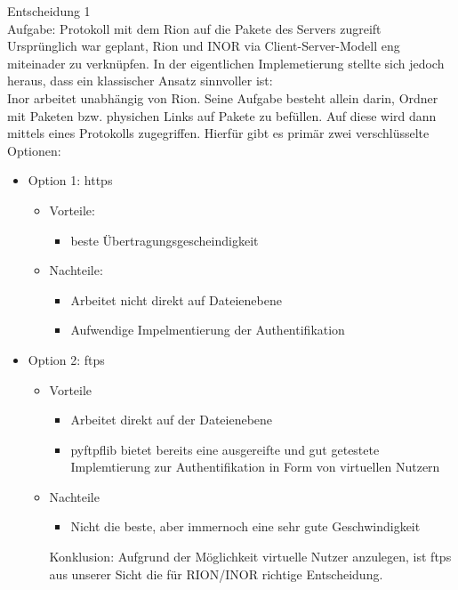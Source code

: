 Entscheidung 1\\
Aufgabe: Protokoll mit dem Rion auf die Pakete des Servers zugreift\\

Ursprünglich war geplant, Rion und INOR via Client-Server-Modell eng miteinader zu
verknüpfen. In der eigentlichen Implemetierung stellte sich jedoch heraus, dass ein
klassischer Ansatz sinnvoller ist: \\

Inor arbeitet unabhängig von Rion. Seine Aufgabe besteht allein darin, Ordner mit Paketen
bzw. physichen Links auf Pakete zu befüllen. Auf diese wird dann mittels eines Protokolls
zugegriffen. Hierfür gibt es primär zwei verschlüsselte Optionen:\\

\begin{itemize}
    \item Option 1: https
    \begin{itemize}
        \item Vorteile:
            \begin{itemize}
                \item beste Übertragungsgescheindigkeit
            \end{itemize}
        \item Nachteile:
            \begin{itemize}
                \item  Arbeitet nicht direkt auf Dateienebene
                \item Aufwendige Impelmentierung der Authentifikation
            \end{itemize}
    \end{itemize}
     \item Option 2: ftps
    \begin{itemize}
        \item Vorteile
        \begin{itemize}
        \item Arbeitet direkt auf der Dateienebene
        \item pyftpflib bietet bereits eine ausgereifte und gut getestete Implemtierung zur
Authentifikation in Form von virtuellen Nutzern
        \end{itemize}
        \item Nachteile
        \begin{itemize}
            \item Nicht die beste, aber immernoch eine sehr gute Geschwindigkeit
        \end{itemize}
        Konklusion: Aufgrund der Möglichkeit virtuelle Nutzer anzulegen, ist ftps aus unserer Sicht
die für RION/INOR richtige Entscheidung.


        
    \end{itemize}
\end{itemize}
\clearpage

